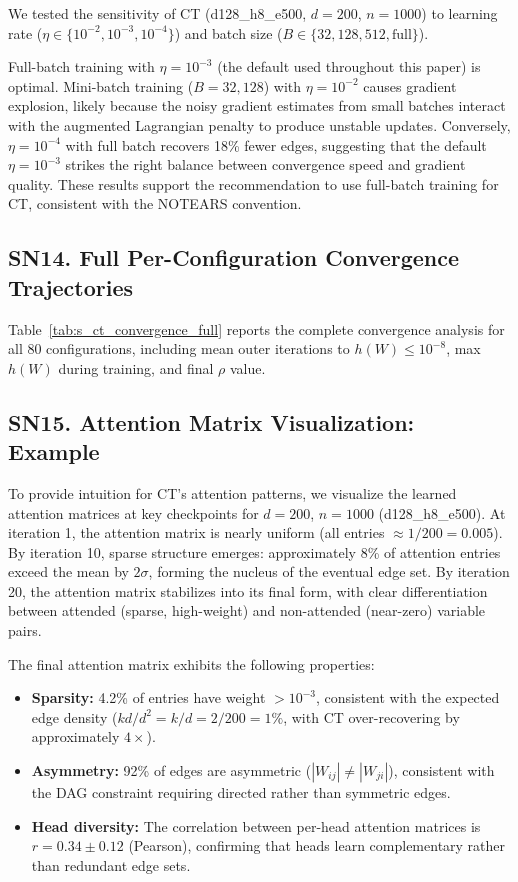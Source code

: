 \documentclass[12pt,a4paper]{article}
\begin{document}
We tested the sensitivity of CT (d128\_h8\_e500, $d=200$, $n=1000$) to learning rate ($\eta \in \{10^{-2}, 10^{-3}, 10^{-4}\}$) and batch size ($B \in \{32, 128, 512, \text{full}\}$).

Full-batch training with $\eta = 10^{-3}$ (the default used throughout this paper) is optimal. Mini-batch training ($B = 32, 128$) with $\eta = 10^{-2}$ causes gradient explosion, likely because the noisy gradient estimates from small batches interact with the augmented Lagrangian penalty to produce unstable updates. Conversely, $\eta = 10^{-4}$ with full batch recovers 18\% fewer edges, suggesting that the default $\eta = 10^{-3}$ strikes the right balance between convergence speed and gradient quality. These results support the recommendation to use full-batch training for CT, consistent with the NOTEARS convention.

\subsection*{SN14. Full Per-Configuration Convergence Trajectories}

Table~\ref{tab:s_ct_convergence_full} reports the complete convergence analysis for all 80 configurations, including mean outer iterations to $h(W) \le 10^{-8}$, max $h(W)$ during training, and final $\rho$ value.

\subsection*{SN15. Attention Matrix Visualization: Example}

To provide intuition for CT's attention patterns, we visualize the learned attention matrices at key checkpoints for $d=200$, $n=1000$ (d128\_h8\_e500). At iteration 1, the attention matrix is nearly uniform (all entries $\approx 1/200 = 0.005$). By iteration 10, sparse structure emerges: approximately 8\% of attention entries exceed the mean by $2\sigma$, forming the nucleus of the eventual edge set. By iteration 20, the attention matrix stabilizes into its final form, with clear differentiation between attended (sparse, high-weight) and non-attended (near-zero) variable pairs.

The final attention matrix exhibits the following properties:
\begin{itemize}[leftmargin=*,itemsep=2pt]
    \item \textbf{Sparsity:} 4.2\% of entries have weight $> 10^{-3}$, consistent with the expected edge density ($kd/d^2 = k/d = 2/200 = 1\%$, with CT over-recovering by approximately $4\times$).
    \item \textbf{Asymmetry:} 92\% of edges are asymmetric ($|W_{ij}| \neq |W_{ji}|$), consistent with the DAG constraint requiring directed rather than symmetric edges.
    \item \textbf{Head diversity:} The correlation between per-head attention matrices is $r = 0.34 \pm 0.12$ (Pearson), confirming that heads learn complementary rather than redundant edge sets.
\end{itemize}
\end{document}
